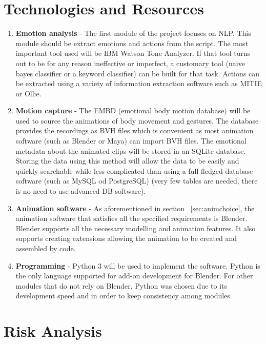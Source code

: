 \section{Technologies and Resources}

\begin{enumerate}
\item \textbf{Emotion analysis} - The first module of the project focuses on NLP. This module should be extract emotions and actions from the script. The most important tool used will be IBM Watson Tone Analyzer. If that tool turns out to be for any reason ineffective or imperfect, a customary tool (naive bayes classifier or a keyword classifier) can be built for that task. Actions can be extracted using a variety of information extraction software such as MITIE or Ollie.

\item \textbf{Motion capture} - The EMBD (emotional body motion database) will be used to source the animations of body movement and gestures. The database provides the recordings as BVH files which is convenient as most animation software (such as Blender or Maya) can import BVH files. The emotional metadata about the animated clips will be stored in an SQLite database. Storing the data using this method will allow the data to be easily and quickly searchable while less complicated than using a full fledged database software (such as MySQL od PostgreSQL) (very few tables are needed, there is no need to use advanced DB software).

\item \textbf{Animation software} - As aforementioned in section ~\ref{sec:animchoice}, the animation software that satisfies all the specified requirements is Blender. Blender supports all the necessary modelling and animation features. It also supports creating extensions allowing the animation to be created and assembled by code.

\item \textbf{Programming} - Python 3 will be used to implement the software. Python is the only language supported for add-on development for Blender. For other modules that do not rely on Blender, Python was chosen due to its development speed and in order to keep consistency among modules.

\end{enumerate}

\section{Risk Analysis}
\label{sec:riskanal}

